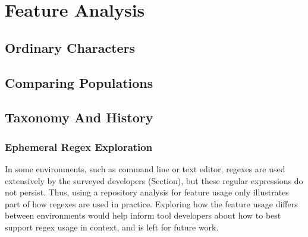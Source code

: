 \section{Feature Analysis}

\subsection{Ordinary Characters}

\subsection{Comparing Populations}

\subsection{Taxonomy And History}

\subsubsection{Ephemeral Regex Exploration}
In some environments, such as command line or text editor, regexes are used extensively by the surveyed developers (Section), but these regular expressions do not persist. Thus, using a repository analysis for feature usage only illustrates part of how regexes are used in practice. Exploring how the feature usage differs between environments would help inform tool developers about how to best support regex usage in context, and is left for future work.

